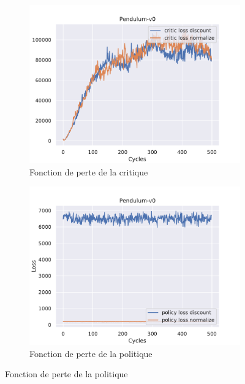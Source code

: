 \begin{figure}[H]
    \centering
    \begin{subfigure}{0.3\textwidth}
        \includegraphics[width=\textwidth]{figures/iteration2/critic_loss_Pendulum-v0_pg_dataset_td_eval_True_cycles_500_trajs_20_batches_20_gamma_0.99_nstep_5_lr_act_0.01_lr_critic_0.01pg.pdf}
        \caption{Fonction de perte de la critique}
    \end{subfigure}
    \begin{subfigure}{0.3\textwidth}
        \includegraphics[width=\textwidth]{figures/iteration2/policy_loss_Pendulum-v0_pg_dataset_td_eval_True_cycles_500_trajs_20_batches_20_gamma_0.99_nstep_5_lr_act_0.01_lr_critic_0.01pg.pdf}
        \caption{Fonction de perte de la politique}

\end{subfigure}
\end{figure}
